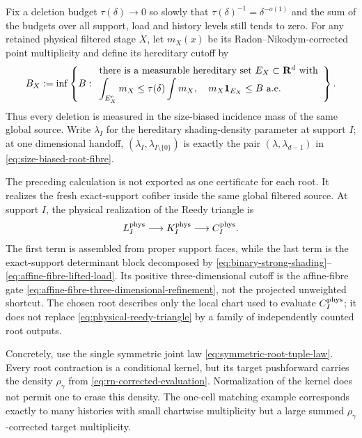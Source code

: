 \documentclass[11pt]{article}
\newcommand{\R}{\mathbf R}
\begin{document}
Fix a deletion budget \(\tau(\delta)\to0\) so slowly that
\(\tau(\delta)^{-1}=\delta^{-o(1)}\) and the sum of the budgets over all
support, load and history levels still tends to zero.  For any retained
physical filtered stage \(X\), let \(m_X(x)\) be its Radon--Nikodym-corrected
point multiplicity and define its hereditary cutoff by
\begin{equation}\label{eq:hereditary-cutoff-definition}
 B_X
 :=
 \inf\left\{B:
 \begin{array}{l}
  \text{there is a measurable hereditary set }E_X\subset\R^d\text{ with}\\[0.1em]
  \displaystyle
  \int_{E_X^c}m_X\le\tau(\delta)\int m_X,
  \quad m_X{\bf1}_{E_X}\le B\ \text{a.e.}
 \end{array}
 \right\}.
\end{equation}
Thus every deletion is measured in the size-biased incidence mass of the same
global source.  Write \(\lambda_I\) for the hereditary shading-density
parameter at support \(I\); at one dimensional handoff,
\((\lambda_I,\lambda_{I\setminus\{0\}})\) is exactly the pair
\((\lambda,\lambda_{d-1})\) in
\eqref{eq:size-biased-root-fibre}.

The preceding calculation is not exported as one certificate for each root.
It realizes the fresh exact-support cofiber inside the same global filtered
source.  At support \(I\), the physical realization of the Reedy triangle is
\begin{equation}\label{eq:physical-reedy-triangle}
 L_I^{\rm phys}
 \longrightarrow
 K_I^{\rm phys}
 \longrightarrow
 C_I^{\rm phys}.
\end{equation}
The first term is assembled from proper support faces, while the last term is
the exact-support determinant block decomposed by
\eqref{eq:binary-strong-shading}--%
\eqref{eq:affine-fibre-lifted-load}.  Its positive three-dimensional cutoff is
the affine-fibre gate
\eqref{eq:affine-fibre-three-dimensional-refinement}, not the projected
unweighted shortcut.
The chosen root describes only the local chart used to evaluate
\(C_I^{\rm phys}\); it does not replace
\eqref{eq:physical-reedy-triangle} by a family of independently counted root
outputs.

Concretely, use the single symmetric joint law
\eqref{eq:symmetric-root-tuple-law}.  Every root contraction is a conditional
kernel, but its target pushforward carries the density \(\rho_\gamma\) from
\eqref{eq:rn-corrected-evaluation}.  Normalization of the kernel does not permit
one to erase this density.  The one-cell matching example corresponds exactly
to many histories with small chartwise multiplicity but a large summed
\(\rho_\gamma\)-corrected target multiplicity.
\end{document}
